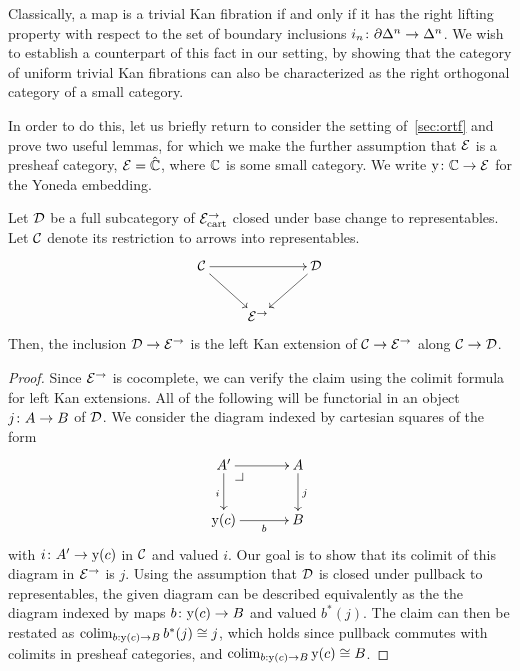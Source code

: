 \documentclass[reqno,10pt,a4paper,oneside]{amsart}
\begin{document}
 
 
 
 
 
Classically, a map is a  trivial Kan fibration if and only if it has the right lifting property with respect to the
set of boundary inclusions $i_n \co \partial \Delta^n \to \Delta^n$. We wish to establish a counterpart of 
this fact in our setting, by showing that the category of uniform trivial Kan fibrations can also be 
characterized as the right orthogonal category of  a small category.






\medskip

\newcommand{\yon}{\mathrm{y}} 

In order to do this, let us briefly return to consider the setting of~\cref{sec:ortf} and prove two useful lemmas,
for which we make the further assumption that $\catE$ is a presheaf category, \ie $\catE = \hat{\cat{C}}$, where $\catC$ is some small category. We write $\yon \co \cat{C} \to \catE$ for the Yoneda embedding.

\begin{lemma}
\label{left-kan-extension-of-representables}
Let $\cal{D}$ be a full subcategory of $\catE_{\cart}^{\to}$ closed under base change to representables.
Let $\cal{C}$ denote its restriction to arrows into representables.
\[
\xymatrix{
  \cal{C}
  \ar[rr]
  \ar[dr]
&&
  \cal{D}
  \ar[dl]
\\&
  \catE^{\to}
}
\]
Then, the inclusion $\cal{D} \to \catE^{\to}$ is the left Kan extension of $\cal{C} \to \catE^{\to}$ along $\cal{C} \to \cal{D}$.
\end{lemma}



\begin{proof}
Since $\catE^{\to}$ is cocomplete, we can verify the claim using  the colimit formula for left Kan extensions.
All of the following will be functorial in an object $j \co A \to B$ of $\cal{D}$.
We consider the diagram indexed by cartesian squares of the form
\[
\xymatrix@C=1.2cm{
  A'
  \ar[r]
  \ar[d]_{i}
  \pullback{dr}
&
  A
  \ar[d]^{j}
\\
  \yon(c) 
  \ar[r]_-b 
&
  B
}
\]
with $i \co A' \to \yon(c)$ in $\cal{C}$ and valued $i$.
Our goal is to show that its colimit of this diagram in $\catE^{\to}$ is $j$.
Using the assumption that $\cal{D}$ is closed under pullback to representables, the given diagram
can be described equivalently as the the diagram indexed by maps $b \co \yon(c) \to B$ and valued $b^*(j)$. The claim can then be restated as  $\colim_{b : \yon(c) \to B} b^*(j) \iso j$, which 
holds since pullback commutes with colimits in presheaf categories, and  $\colim_{b : \yon(c) \to B} \yon(c) \iso B$.
\end{proof}
\end{document}
